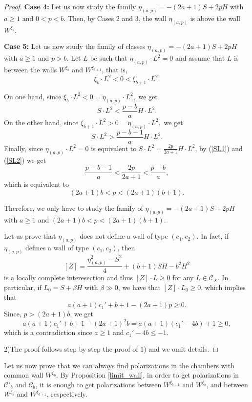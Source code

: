 \documentclass[11pt,twoside]{amsart}
\theoremstyle{definition}
\begin{document}
\begin{proof}
\textbf{Case 4: }
   Let us now study the family $\eta_{(a,p)}= -(2a+1)S+2pH$ with $a\geq1$ and $0<p<b$. Then, by Cases 2 and 3,  the wall $\eta_{(a,p)}$ is above the wall $W^{\xi_b}$.
   
\textbf{Case 5:}
Let us now study the family of classes $\eta_{(a,p)}= -(2a+1)S+2pH$ with $a\geq1$ and $p>b$.
Let $L$ be such that $\eta_{(a,p)}\cdot L^2=0$ and assume that $L$ is between the walls $W^{\xi_b}$ and $W^{\xi_{b+1}}$, that is, $$\xi_b\cdot L^2<0<\xi_{b+1}\cdot L^2.$$

On one hand, since $\xi_b\cdot L^2<0=\eta_{(a,p)}\cdot L^2,$
we get 
\begin{equation}
\label{SL1}
S\cdot L^2<\frac{p-b}{a}H\cdot L^2.    
\end{equation}
On the other hand, since $\xi_{b+1}\cdot L^2>0=\eta_{(a,p)}\cdot L^2,$
we get 
\begin{equation}
    \label{SL2}
    S\cdot L^2>\frac{p-b-1}{a}H\cdot L^2.
\end{equation}
Finally, since $\eta_{(a,p)}\cdot L^2=0$ is equivalent to $S\cdot L^2=\frac{2p}{2a+1}H\cdot L^2$, by (\ref{SL1}) and (\ref{SL2}) we get $$\frac{p-b-1}{a}<\frac{2p}{2a+1}<\frac{p-b}{a},$$
which is equivalent to $$(2a+1)b<p<(2a+1)(b+1).$$

Therefore, we only have to study the family of $\eta_{(a,p)}=-(2a+1)S+2pH$ with $a\geq1$ and $(2a+1)b<p<(2a+1)(b+1).$

Let us prove that $\eta_{(a,p)}$ does not define a wall of type $(c_1,c_2)$.
In fact, if $\eta_{(a,p)}$ defines a wall of type $(c_1,c_2)$, then  $$[Z]=\frac{\eta_{(a,p)}^2-S^2}{4}+(b+1)SH-b^2H^2$$ is a locally complete interesection and thus $[Z]\cdot L\geq0$ for any $L\in\mathcal{C}_X$. In particular, if $L_0=S+\beta H$ with $\beta\gg0$, we have that $[Z]\cdot L_0\geq0$, which implies that $$a(a+1)c_1'+b+1-(2a+1)p\geq0.$$
Since, $p>(2a+1)b$, we get $$a(a+1)c_1'+b+1-(2a+1)^2b=a(a+1)(c_1'-4b)+1\geq0,$$ which is a contradiction since $a\geq1$ and $c_1'-4b\leq-1$.


2)The proof follows step by step the proof of  1) and we omit details.

\end{proof}





Let us now prove that we can always find polarizations in the chambers with common wall $W^{\xi_b}$. By Proposition \ref{limit_wall}, in order to get polarizations in $\mathcal{C}'_b$ and $\mathcal{C}_b$, it is enough to get polarizations between $W^{\xi_{b-1}}$ and $W^{\xi_b}$, and between $W^{\xi_{b}}$ and $W^{\xi_{b+1}}$, respectively.
\end{document}
